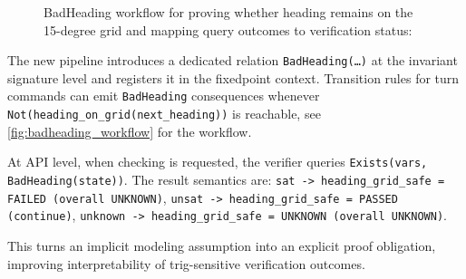 \begin{figure}[h]

\caption{BadHeading workflow for proving whether heading remains on the 15-degree grid and mapping query outcomes to verification status:}
\label{fig:badheading_workflow}
\end{figure}

The new pipeline introduces a dedicated relation
\texttt{BadHeading(\ldots)} at the invariant signature level and registers it in the fixedpoint context. Transition rules for turn commands can emit
\texttt{BadHeading} consequences whenever \texttt{Not(heading\_on\_grid(next\_heading))}
is reachable, see \autoref{fig:badheading_workflow} for the workflow.

At API level, when checking is requested, the verifier queries
\texttt{Exists(vars, BadHeading(state))}. The result semantics are:
\texttt{sat -> heading\_grid\_safe = FAILED (overall UNKNOWN)},
\texttt{unsat -> heading\_grid\_safe = PASSED (continue)},
\texttt{unknown -> heading\_grid\_safe = UNKNOWN (overall UNKNOWN)}.

This turns an implicit modeling assumption into an explicit proof obligation,
improving interpretability of trig-sensitive verification outcomes.

